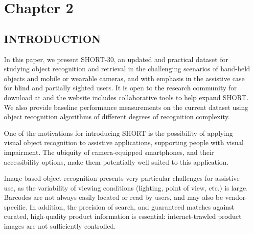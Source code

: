 \chapter{Chapter 2}\label{ch:chapter2}


\section{INTRODUCTION}
\label{sec:intro}

In this paper, we present SHORT-30, an updated and practical dataset for studying object recognition and retrieval in the challenging scenarios of hand-held objects and mobile or wearable cameras, and with emphasis in the assistive case for blind and partially sighted users. It is open to the research community for download at \cite{Rivera-Rubio} and the website includes collaborative tools to help expand SHORT.
We also provide baseline performance measurements on the current dataset using object recognition algorithms of different degrees of recognition complexity.

One of the motivations for introducing SHORT is the possibility of applying visual object recognition to assistive applications, supporting people with visual impairment.  The ubiquity of  camera-equipped smartphones, and their accessibility options, make them potentially well suited to this application. 

Image-based object recognition presents very particular challenges for assistive use, as the variability of viewing conditions (lighting, point of view, etc.) is large.  Barcodes are not always easily located or read by users, and may also be vendor-specific. In addition, the precision of search, and guaranteed matches against curated, high-quality product information is essential: internet-trawled product images are not sufficiently controlled. 

